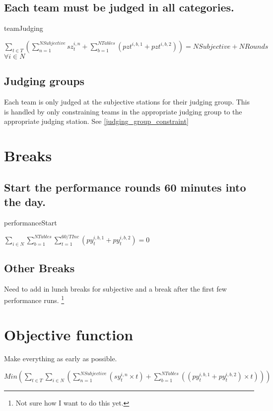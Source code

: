 \documentclass[letterpaper,11pt]{report}
\newcommand{\doccomment}[3]%
{\marginpar{\textcolor{#2}{\bf #1}}%
\footnote{{\color{#2}#3}}%
}
\newcommand{\doccomment}[3]{}
\newcommand{\jpscomment}[1]%
{\doccomment{SCHEWE}{Bittersweet}{#1}}
\begin{document}
\FloatBarrier
\subsection{Each team must be judged in all categories.}
\begin{algorithm}
\caption{teamJudging}
$\sum\limits_{t \in T} ( 
    \sum\limits_{n=1}^{NSubjective} sz_{t}^{i,n}  
 + \sum\limits_{b=1}^{NTables} (pz{t}^{i,b,1} + pz{t}^{i,b,2})
)
= NSubjective + NRounds$
\hfill $\forall i \in N$
\end{algorithm}

\FloatBarrier
\subsection{Judging groups}
Each team is only judged at the subjective stations for their judging
group. This is handled by only constraining teams in the appropriate
judging group to the appropriate judging station. See \autoref{judging_group_constraint}


\FloatBarrier
\section{Breaks}
\subsection{Start the performance rounds 60 minutes into the day.}
\begin{algorithm}
\caption{performanceStart}
$\sum\limits_{i \in N} \sum\limits_{b=1}^{NTables} 
    \sum\limits_{t = 1}^{60/TInc} 
      ( py_{t}^{i,b,1} + py_{t}^{i,b,2} ) = 0$
\end{algorithm}
    
\subsection{Other Breaks}
Need to add in lunch breaks for subjective and a break after the first few
performance runs. \jpscomment{Not sure how I want to do this yet.}

\section{Objective function}
Make everything as early as possible.

$Min ( 
\sum\limits_{t \in T}
  \sum\limits_{i \in N} (
    \sum\limits_{n=1}^{NSubjective}
      ( sy_{t}^{i,n} \times t )
  + \sum\limits_{b=1}^{NTables} ( ( py_{t}^{i,b,1} + py_{t}^{i,b,2} )
  \times t)
  )
) $
\end{document}
